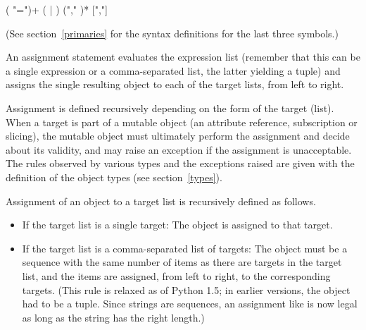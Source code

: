 \begin{productionlist}
             {( "=")+
              ( | )}
             { ("," )* [","]}
             {}
\end{productionlist}

(See section~\ref{primaries} for the syntax definitions for the last
three symbols.)

An assignment statement evaluates the expression list (remember that
this can be a single expression or a comma-separated list, the latter
yielding a tuple) and assigns the single resulting object to each of
the target lists, from left to right.

Assignment is defined recursively depending on the form of the target
(list).  When a target is part of a mutable object (an attribute
reference, subscription or slicing), the mutable object must
ultimately perform the assignment and decide about its validity, and
may raise an exception if the assignment is unacceptable.  The rules
observed by various types and the exceptions raised are given with the
definition of the object types (see section~\ref{types}).

Assignment of an object to a target list is recursively defined as
follows.

\begin{itemize}
\item
If the target list is a single target: The object is assigned to that
target.

\item
If the target list is a comma-separated list of targets: The object
must be a sequence with the same number of items as there are
targets in the target list, and the items are assigned, from left to
right, to the corresponding targets.  (This rule is relaxed as of
Python 1.5; in earlier versions, the object had to be a tuple.  Since
strings are sequences, an assignment like  is
now legal as long as the string has the right length.)

\end{itemize}

